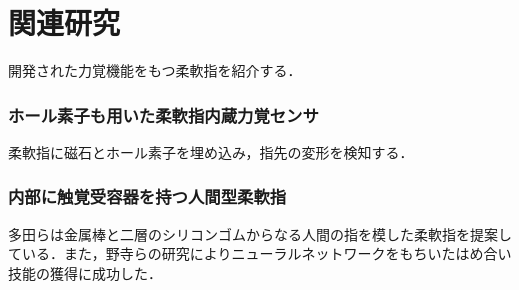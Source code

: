 \section{関連研究}
開発された力覚機能をもつ柔軟指を紹介する．
\subsubsection{ホール素子も用いた柔軟指内蔵力覚センサ}
柔軟指に磁石とホール素子を埋め込み，指先の変形を検知する\cite{hole}．

\subsubsection{内部に触覚受容器を持つ人間型柔軟指}
多田らは金属棒と二層のシリコンゴムからなる人間の指を模した柔軟指を提案している\cite{ningen}．また，野寺らの研究によりニューラルネットワークをもちいたはめ合い技能の獲得に成功した\cite{hameai}．
